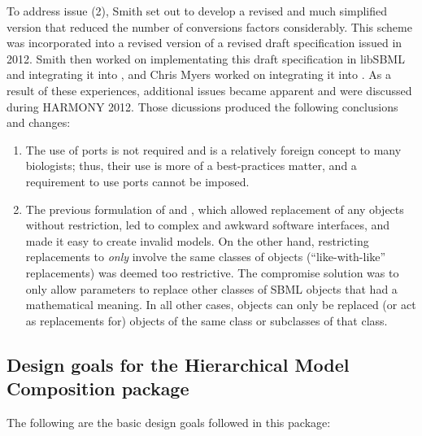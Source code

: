 To address issue (2), Smith set out to develop a revised and much simplified version that reduced the number of conversions factors considerably.  This scheme was incorporated into a revised version of a revised draft specification issued in 2012.  Smith then worked on implementating this draft specification in libSBML and integrating it into , and Chris Myers worked on integrating it into .  As a result of these experiences, additional issues became apparent and were discussed during HARMONY 2012.  Those dicussions produced the following conclusions and changes:

\begin{enumerate}

\item The use of ports is not required and is a relatively foreign concept to many biologists; thus, their use is more of a best-practices matter, and a requirement to use ports cannot be imposed.

\item The previous formulation of \ReplacedElement and \ReplacedBy, which allowed replacement of any objects without restriction, led to complex and awkward software interfaces, and made it easy to create invalid models.  On the other hand, restricting replacements to \emph{only} involve the same classes of objects (``like-with-like'' replacements) was deemed too restrictive.  The compromise solution was to only allow parameters to replace other classes of SBML objects that had a mathematical meaning.  In all other cases, objects can only be replaced (or act as replacements for) objects of the same class or subclasses of that class.

\end{enumerate}



\subsection{Design goals for the Hierarchical Model Composition package}
\label{sec:design-goals}

The following are the basic design goals followed in this package:

